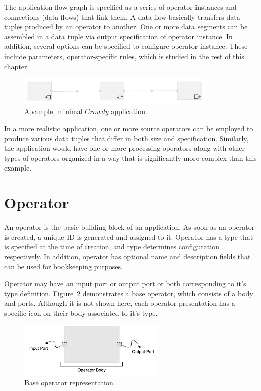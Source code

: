 The application flow graph is specified as a series of operator instances and connections 
(data flows) that link them. A data flow basically transfers data tuples 
produced by an operator to another. One or more data segments can be assembled in a 
data tuple via output specification of operator instance. In addition, several options can 
be specified to configure operator instance. These include parameters, operator-specific 
rules, which is studied in the rest of this chapter.

\begin{figure}[ht]
	\centering
	\includegraphics[width=0.85\textwidth]{figures/helloworld.png}
	\caption{A sample, minimal $Crowdy$ application.}
	\label{fig:hello world}
\end{figure}

In a more realistic application, one or more source operators can be employed to produce 
various data tuples that differ in both size and specification. Similarly, the application would 
have one or more processing operators along with other types of operators organized in a way 
that is significantly more complex than this example.

\section{Operator}
An operator is the basic building block of an application. As soon as an operator is created, 
a unique ID is generated and assigned to it. Operator has a type that is specified at the time of 
creation, and type determines configuration respectively. In addition, operator has optional 
name and description fields that can be used for bookkeeping purposes.

Operator may have an input port or output port or both corresponding to it's type 
definition. Figure~\ref{fig:basic operator} demonstrates a base operator, which 
consists of a body and ports. Although it is not shown here, each operator presentation 
has a specific icon on their body associated to it's type.

\begin{figure}[ht]
	\centering
	\includegraphics[height=100px]{figures/basicoperator.pdf}
	\caption{Base operator representation.}
	\label{fig:basic operator}
\end{figure}

